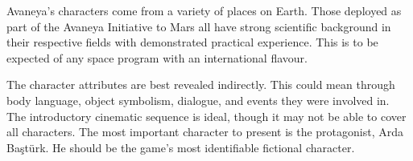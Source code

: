

Avaneya's characters come from a variety of places on Earth. Those deployed as part of the Avaneya Initiative to Mars all have strong scientific background in their respective fields with demonstrated practical experience. This is to be expected of any space program with an international flavour.

The character attributes are best revealed indirectly. This could mean through body language, object symbolism, dialogue, and events they were involved in. The introductory cinematic sequence is ideal, though it may not be able to cover all characters. The most important character to present is the protagonist, Arda Baştürk. He should be the game's most identifiable fictional character.

%

%
%

\StopChapter

